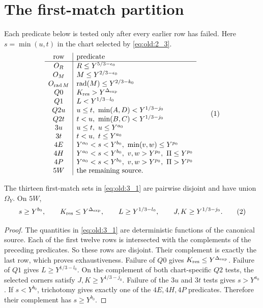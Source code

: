 \section{The first-match partition}\label{sec:partition}

Each predicate below is tested only after every earlier row has failed.
Here \(s=\min(u,t)\) in the chart selected by \eqref{eq:old:2_3}.
\[
\begin{array}{c|l}
\text{row}&\text{predicate}\\ \hline
O_R&R\le Y^{5/3-\epsilon_0}\\
O_M&M\le Y^{2/3-\epsilon_0}\\
O_{\operatorname{rad}M}&\operatorname{rad}(M)\le Y^{2/3-k_0}\\
Q0&K_{\rm res}>Y^{\Delta_{\rm exp}}\\
Q1&L<Y^{1/3-l_0}\\
Q2u&u\le t,\ \min(A,D)<Y^{1/3-j_0}\\
Q2t&t<u,\ \min(B,C)<Y^{1/3-j_0}\\
3u&u\le t,\ u\le Y^{a_0}\\
3t&t<u,\ t\le Y^{a_0}\\
4E&Y^{a_0}<s<Y^{b_0},\ \min(v,w)\le Y^{p_0}\\
4H&Y^{a_0}<s<Y^{b_0},\ v,w>Y^{p_0},\ \Pi\le Y^{p_0}\\
4P&Y^{a_0}<s<Y^{b_0},\ v,w>Y^{p_0},\ \Pi>Y^{p_0}\\
5W&\text{the remaining source.}
\end{array}\AutoTag{eq:old:3_1}
\]

\begin{theorem}\label{thm:partition}
The thirteen first-match sets in \eqref{eq:old:3_1} are pairwise disjoint and have union
\(\Omega_Y\). On \(5W\),
\[
s\ge Y^{b_0},\qquad K_{\rm res}\le Y^{\Delta_{\rm exp}},\qquad
L\ge Y^{1/3-l_0},\qquad J,K\ge Y^{1/3-j_0}.
\AutoTag{eq:old:3_2}
\]
\end{theorem}

\begin{proof}
The quantities in \eqref{eq:old:3_1} are deterministic functions of the canonical
source. Each of the first twelve rows is intersected with the complements of
the preceding predicates. So these rows are disjoint. Their complement is
exactly the last row, which proves exhaustiveness. Failure of \(Q0\) gives
\(K_{\rm res}\le Y^{\Delta_{\rm exp}}\). Failure of \(Q1\) gives
\(L\ge Y^{1/3-l_0}\). On the complement of both chart-specific \(Q2\)
tests, the selected corners satisfy \(J,K\ge Y^{1/3-j_0}\).
Failure of the \(3u\) and \(3t\) tests gives \(s>Y^{a_0}\).
If \(s<Y^{b_0}\), trichotomy gives exactly one of the \(4E,4H,4P\)
predicates. Therefore their complement has \(s\ge Y^{b_0}\).
\end{proof}

